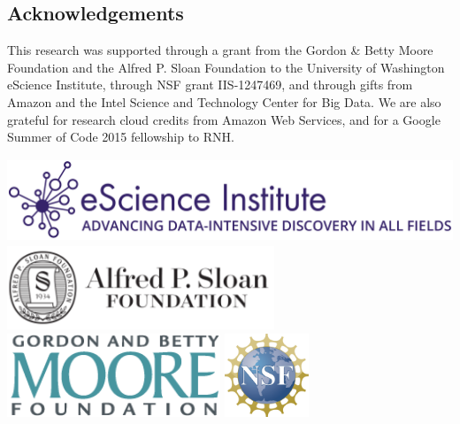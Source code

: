 \documentclass[a0, landscape]{a0poster}
\begin{document}
\begin{multicols}{3}
\color{DarkSlateGray} %


\nocite{*} %
\footnotesize  %

\subsection*{Acknowledgements} \footnotesize This research was supported through
a grant from the Gordon \& Betty Moore Foundation and the Alfred P. Sloan
Foundation to the University of Washington eScience Institute, through NSF grant
IIS-1247469, and through gifts from Amazon and the Intel Science and Technology
Center for Big Data. We are also grateful for research cloud credits from Amazon
Web Services, and for a Google Summer of Code 2015 fellowship to RNH.

\includegraphics[height=2.5cm]{eSciencelogo.png}
\includegraphics[height=2.5cm]{SloanLogo.png}
\includegraphics[height=2.5cm]{MooreFdn.png}
\includegraphics[height=2.5cm]{NSFLogo}

\end{multicols}
\end{document}
